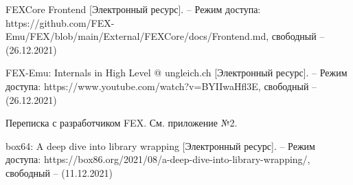 \begin{thebibliography}{}
FEXCore Frontend [Электронный ресурс]. -- Режим доступа: 	https://github.com/FEX-Emu/FEX/blob/main/External/FEXCore/docs/Frontend.md,
свободный -- (26.12.2021)	

FEX-Emu: Internals in High Level @ ungleich.ch [Электронный ресурс]. -- Режим доступа: 		https://www.youtube.com/watch?v=BYIIwaHfl3E,
свободный -- (26.12.2021)

Переписка с разработчиком FEX. См. приложение №2.

box64: A deep dive into library wrapping [Электронный ресурс]. -- Режим доступа: https://box86.org/2021/08/a-deep-dive-into-library-wrapping/,
свободный -- (11.12.2021)

	
	
\end{thebibliography}
\endgroup

\pagebreak
